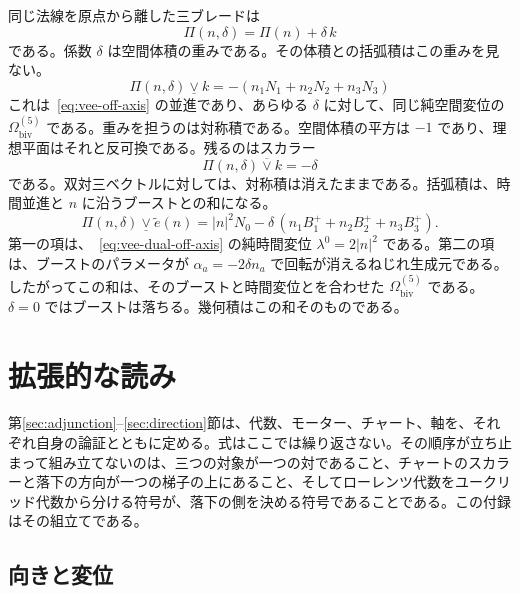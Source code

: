 \documentclass[a4paper]{article}
\begin{document}
同じ法線を原点から離した三ブレードは
\begin{equation}
\label{eq:plane-displaced}
\Pi(n,\delta)=\Pi(n)+\delta\,k
\end{equation}
である。係数 \(\delta\) は空間体積の重みである。その体積との括弧積はこの重みを見ない。
\begin{equation}
\label{eq:vee-displaced}
\Pi(n,\delta)\mathbin{\underline{\vee}} k=-(n_{1}N_{1}+n_{2}N_{2}+n_{3}N_{3})
\end{equation}
これは~\eqref{eq:vee-off-axis} の並進であり、あらゆる \(\delta\) に対して、同じ純空間変位の \(\Omega_{\mathrm{biv}}^{(5)}\) である。重みを担うのは対称積である。空間体積の平方は \(-1\) であり、理想平面はそれと反可換である。残るのはスカラー
\begin{equation}
\label{eq:sym-displaced}
\Pi(n,\delta)\mathbin{\overline{\vee}} k=-\delta
\end{equation}
である。双対三ベクトルに対しては、対称積は消えたままである。括弧積は、時間並進と \(n\) に沿うブーストとの和になる。
\begin{equation}
\label{eq:vee-displaced-dual}
\Pi(n,\delta)\mathbin{\underline{\vee}}\tilde{e}(n)=|n|^{2}N_{0}-\delta\,(n_{1}B^{+}_{1}+n_{2}B^{+}_{2}+n_{3}B^{+}_{3}).
\end{equation}
第一の項は、~\eqref{eq:vee-dual-off-axis} の純時間変位 \(\lambda^{0}=2|n|^{2}\) である。第二の項は、ブーストのパラメータが \(\alpha_{a}=-2\delta n_{a}\) で回転が消えるねじれ生成元である。したがってこの和は、そのブーストと時間変位とを合わせた \(\Omega_{\mathrm{biv}}^{(5)}\) である。\(\delta=0\) ではブーストは落ちる。幾何積はこの和そのものである。

\section{拡張的な読み}
\label{app:reading}

第\ref{sec:adjunction}--\ref{sec:direction}節は、代数、モーター、チャート、軸を、それぞれ自身の論証とともに定める。式はここでは繰り返さない。その順序が立ち止まって組み立てないのは、三つの対象が一つの対であること、チャートのスカラーと落下の方向が一つの梯子の上にあること、そしてローレンツ代数をユークリッド代数から分ける符号が、落下の側を決める符号であることである。この付録はその組立てである。

\subsection{向きと変位}
\end{document}
